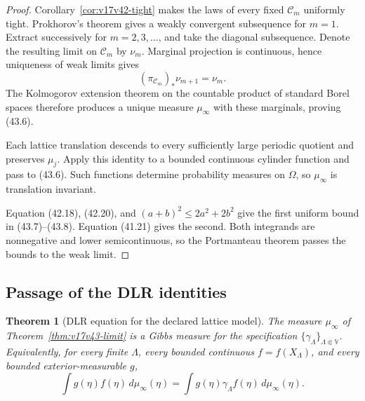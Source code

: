 \documentclass[11pt]{article}
\newtheorem{theorem}{Theorem}[section]
\theoremstyle{remark}
\begin{document}
\begin{proof}
Corollary~\ref{cor:v17v42-tight} makes the laws of every fixed
\(\mathcal C_m\) uniformly tight.  Prokhorov's theorem gives a weakly
convergent subsequence for \(m=1\).  Extract successively for
\(m=2,3,\ldots\), and take the diagonal subsequence.  Denote the
resulting limit on \(\mathcal C_m\) by \(\nu_m\).  Marginal projection
is continuous, hence uniqueness of weak limits gives
\[
 (\pi_{\mathcal C_m})_*\nu_{m+1}=\nu_m.            \tag{43.9}
\]
The Kolmogorov extension theorem on the countable product of standard
Borel spaces therefore produces a unique measure \(\mu_\infty\) with
these marginals, proving (43.6).

Each lattice translation descends to every sufficiently large
periodic quotient and preserves \(\mu_j\).  Apply this identity to a
bounded continuous cylinder function and pass to (43.6).  Such
functions determine probability measures on \(\Omega\), so
\(\mu_\infty\) is translation invariant.

Equation (42.18), (42.20), and
\((a+b)^2\leq2a^2+2b^2\) give the first uniform bound in
(43.7)--(43.8).  Equation (41.21) gives the second.  Both integrands
are nonnegative and lower semicontinuous, so the Portmanteau theorem
passes the bounds to the weak limit.
\end{proof}

\subsection{Passage of the DLR identities}

\begin{theorem}[DLR equation for the declared lattice model]
\label{thm:v17v43-dlr}
The measure \(\mu_\infty\) of
Theorem~\ref{thm:v17v43-limit} is a Gibbs measure for the specification
\(\{\gamma_\Lambda\}_{\Lambda\Subset\mathbb V}\).  Equivalently, for
every finite \(\Lambda\), every bounded continuous
\(f=f(X_\Lambda)\), and every bounded exterior-measurable \(g\),
\[
 \int g(\eta)f(\eta)\,d\mu_\infty(\eta)
 =
 \int g(\eta)\gamma_\Lambda f(\eta)
 \,d\mu_\infty(\eta).                              \tag{43.10}
\]
\end{theorem}
\end{document}
